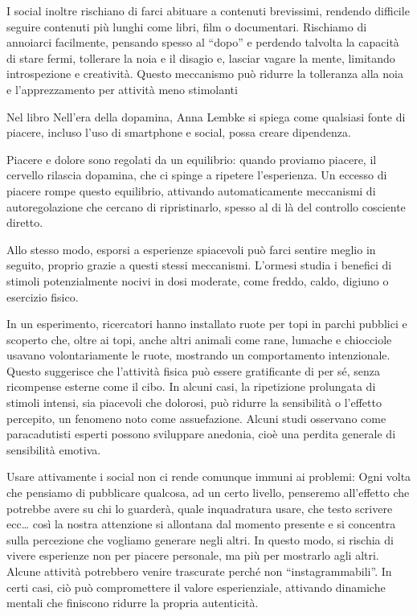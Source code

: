 \documentclass[12pt]{book} %
\begin{document}
\begin{mdframed}[linewidth=1pt]
I social inoltre rischiano di farci abituare a contenuti brevissimi, rendendo difficile seguire contenuti più lunghi come libri, film o documentari. Rischiamo di annoiarci facilmente, pensando spesso al “dopo” e perdendo talvolta la capacità di stare fermi, tollerare la noia e il disagio e, lasciar vagare la mente, limitando introspezione e creatività. Questo meccanismo può ridurre la tolleranza alla noia e l'apprezzamento per attività meno stimolanti

Nel libro Nell'era della dopamina, Anna Lembke si spiega come qualsiasi fonte di piacere, incluso l’uso di smartphone e social, possa creare dipendenza.  

Piacere e dolore sono regolati da un equilibrio: quando proviamo piacere, il cervello rilascia dopamina, che ci spinge a ripetere l’esperienza. Un eccesso di piacere rompe questo equilibrio, attivando automaticamente meccanismi di autoregolazione che cercano di ripristinarlo, spesso al di là del controllo cosciente diretto.

Allo stesso modo, esporsi a esperienze spiacevoli può farci sentire meglio in seguito, proprio grazie a questi stessi meccanismi. L’ormesi studia i benefici di stimoli potenzialmente nocivi in dosi moderate, come freddo, caldo, digiuno o esercizio fisico.

In un esperimento, ricercatori hanno installato ruote per topi in parchi pubblici e scoperto che, oltre ai topi, anche altri animali come rane, lumache e chiocciole usavano volontariamente le ruote, mostrando un comportamento intenzionale. Questo suggerisce che l’attività fisica può essere gratificante di per sé, senza ricompense esterne come il cibo.
In alcuni casi, la ripetizione prolungata di stimoli intensi, sia piacevoli che dolorosi, può ridurre la sensibilità o l’effetto percepito, un fenomeno noto come assuefazione. Alcuni studi osservano come paracadutisti esperti possono sviluppare anedonia, cioè una perdita generale di sensibilità emotiva. 

Usare attivamente i social non ci rende comunque immuni ai problemi: Ogni volta che pensiamo di pubblicare qualcosa, ad un certo livello, penseremo all'effetto che potrebbe avere su chi lo guarderà, quale inquadratura usare, che testo scrivere ecc… così la nostra attenzione si allontana dal momento presente e si concentra sulla percezione che vogliamo generare negli altri. In questo modo, si rischia di vivere esperienze non per piacere personale, ma più per mostrarlo agli altri. Alcune attività potrebbero venire trascurate perché non “instagrammabili”. In certi casi, ciò può compromettere il valore esperienziale, attivando dinamiche mentali che finiscono ridurre la propria autenticità.


\end{mdframed}
\end{document}
